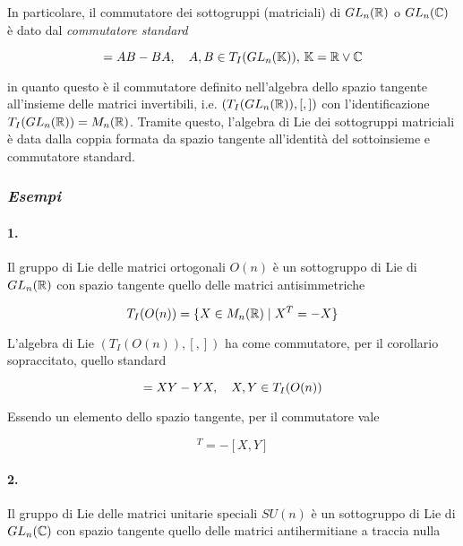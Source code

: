 In particolare, il commutatore dei sottogruppi (matriciali) di $ GL_{n}(\mathbb{R}) $ o $ GL_{n}(\mathbb{C}) $ è dato dal \textit{commutatore standard}

\begin{equation}
	[A,B] = A B - B A \qcomma A,B \in T_{I}(GL_{n}(\K)), \, \K = \R \lor \C
\end{equation}

in quanto questo è il commutatore definito nell'algebra dello spazio tangente all'insieme delle matrici invertibili, i.e. $ (T_{I}(GL_{n}(\mathbb{R})),[,]) $ con l'identificazione $ T_{I}(GL_{n}(\mathbb{R})) = M_{n}(\mathbb{R}) $. Tramite questo, l'algebra di Lie dei sottogruppi matriciali è data dalla coppia formata da spazio tangente all'identità del sottoinsieme e commutatore standard.

\subsubsection{\textit{Esempi}}

\paragraph{1.}

Il gruppo di Lie delle matrici ortogonali $ O(n) $ è un sottogruppo di Lie di $ GL_{n}(\mathbb{R}) $ con spazio tangente quello delle matrici antisimmetriche

\begin{equation}
	T_{I}(O(n)) = \{ X \in M_{n}(\mathbb{R}) \mid X^{T} = -X \}
\end{equation}

L'algebra di Lie $ (T_{I}(O(n)),[,]) $ ha come commutatore, per il corollario sopraccitato, quello standard

\begin{equation}
	[X,Y] = X Y - Y X \qcomma X,Y \in T_{I}(O(n))
\end{equation}

Essendo un elemento dello spazio tangente, per il commutatore vale

\begin{equation}
	[X,Y]^{T} = - [X,Y]
\end{equation}

\paragraph{2.}

Il gruppo di Lie delle matrici unitarie speciali $ SU(n) $ è un sottogruppo di Lie di $ GL_{n}(\mathbb{C}) $ con spazio tangente quello delle matrici antihermitiane a traccia nulla

